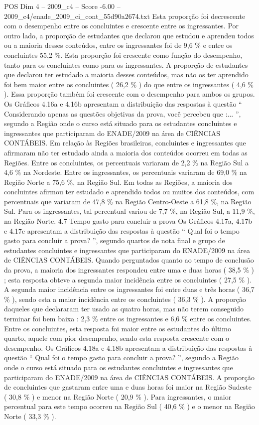 \begin{textsample}{POS Dim 4 – 2009\_c4 – Score -6.00 – 2009\_c4/enade\_2009\_ci\_cont\_55d90a2674.txt}
Esta proporção foi decrescente com o desempenho entre os concluintes e crescente entre os ingressantes.
Por outro lado, a proporção de estudantes que declarou que estudou e aprendeu todos ou a maioria desses conteúdos, entre os ingressantes foi de 9,6 \% e entre os concluintes 55,2 \%.
Esta proporção foi crescente como função do desempenho, tanto para os concluintes como para os ingressantes.
A proporção de estudantes que declarou ter estudado a maioria desses conteúdos, mas não os ter aprendido foi bem maior entre os concluintes ( 26,2 \% ) do que entre os ingressantes ( 4,6 \% ).
Essa proporção também foi crescente com o desempenho para ambos os grupos.
Os Gráficos 4.16a e 4.16b apresentam a distribuição das respostas à questão “ Considerando apenas as questões objetivas da prova, você percebeu que :... ”, segundo a Região onde o curso está situado para os estudantes concluintes e ingressantes que participaram do ENADE/2009 na área de CIÊNCIAS CONTÁBEIS.
Em relação às Regiões brasileiras, concluintes e ingressantes que afirmaram não ter estudado ainda a maioria dos conteúdos ocorreu em todas as Regiões.
Entre os concluintes, os percentuais variaram de 2,2 \% na Região Sul a 4,6 \% na Nordeste.
Entre os ingressantes, os percentuais variaram de 69,0 \% na Região Norte a 75,6 \%, na Região Sul.
Em todas as Regiões, a maioria dos concluintes afirmou ter estudado e aprendido todos ou muitos dos conteúdos, com percentuais que variaram de 47,8 \% na Região Centro-Oeste a 61,8 \%, na Região Sul.
Para os ingressantes, tal percentual variou de 7,7 \%, na Região Sul, a 11,9 \%, na Região Norte. 4.7 Tempo gasto para concluir a prova Os Gráficos 4.17a, 4.17b e 4.17c apresentam a distribuição das respostas à questão “ Qual foi o tempo gasto para concluir a prova? ”, segundo quartos de nota final e grupo de estudantes concluintes e ingressantes que participaram do ENADE/2009 na área de CIÊNCIAS CONTÁBEIS.
Quando perguntados quanto ao tempo de conclusão da prova, a maioria dos ingressantes respondeu entre uma e duas horas ( 38,5 \% ) ; esta resposta obteve a segunda maior incidência entre os concluintes ( 27,5 \% ).
A segunda maior incidência entre os ingressantes foi entre duas e três horas ( 36,7 \% ), sendo esta a maior incidência entre os concluintes ( 36,3 \% ).
A proporção daqueles que declararam ter usado as quatro horas, mas não terem conseguido terminar foi bem baixa : 2,3 \% entre os ingressantes e 6,6 \% entre os concluintes.
Entre os concluintes, esta resposta foi maior entre os estudantes do último quarto, aquele com pior desempenho, sendo esta resposta crescente com o desempenho.
Os Gráficos 4.18a e 4.18b apresentam a distribuição das respostas à questão “ Qual foi o tempo gasto para concluir a prova? ”, segundo a Região onde o curso está situado para os estudantes concluintes e ingressantes que participaram do ENADE/2009 na área de CIÊNCIAS CONTÁBEIS.
A proporção de concluintes que gastaram entre uma e duas horas foi maior na Região Sudeste ( 30,8 \% ) e menor na Região Norte ( 20,9 \% ).
Para ingressantes, o maior percentual para este tempo ocorreu na Região Sul ( 40,6 \% ) e o menor na Região Norte ( 33,3 \% ).

\end{textsample}
